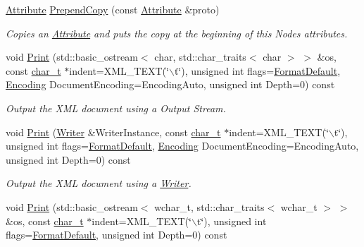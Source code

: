 \begin{DoxyCompactItemize}
\hyperlink{classMezzanine_1_1xml_1_1Attribute}{Attribute} \hyperlink{classMezzanine_1_1xml_1_1Node_a2eba61972c390751d86c2d9beec9b00e}{PrependCopy} (const \hyperlink{classMezzanine_1_1xml_1_1Attribute}{Attribute} \&proto)
\begin{DoxyCompactList}\small\item\em Copies an \hyperlink{classMezzanine_1_1xml_1_1Attribute}{Attribute} and puts the copy at the beginning of this Nodes attributes. \item\end{DoxyCompactList}\item 
void \hyperlink{classMezzanine_1_1xml_1_1Node_a5d07199f212e7736889d370cc40a692b}{Print} (std::basic\_\-ostream$<$ char, std::char\_\-traits$<$ char $>$ $>$ \&os, const \hyperlink{namespaceMezzanine_1_1xml_a29b8a47c179e9895c4e9e66c45d1dbbc}{char\_\-t} $\ast$indent=XML\_\-TEXT(\char`\"{}$\backslash$t\char`\"{}), unsigned int flags=\hyperlink{namespaceMezzanine_1_1xml_ad6b5ebd9ea7799aba19391495e2b09e5}{FormatDefault}, \hyperlink{namespaceMezzanine_1_1xml_ab1e7e96991b9c08ac13e797a15253804}{Encoding} DocumentEncoding=EncodingAuto, unsigned int Depth=0) const 
\begin{DoxyCompactList}\small\item\em Output the XML document using a Output Stream. \item\end{DoxyCompactList}\item 
void \hyperlink{classMezzanine_1_1xml_1_1Node_a94b9b66aff6d1d6a26c1dd5949fabb25}{Print} (\hyperlink{classMezzanine_1_1xml_1_1Writer}{Writer} \&WriterInstance, const \hyperlink{namespaceMezzanine_1_1xml_a29b8a47c179e9895c4e9e66c45d1dbbc}{char\_\-t} $\ast$indent=XML\_\-TEXT(\char`\"{}$\backslash$t\char`\"{}), unsigned int flags=\hyperlink{namespaceMezzanine_1_1xml_ad6b5ebd9ea7799aba19391495e2b09e5}{FormatDefault}, \hyperlink{namespaceMezzanine_1_1xml_ab1e7e96991b9c08ac13e797a15253804}{Encoding} DocumentEncoding=EncodingAuto, unsigned int Depth=0) const 
\begin{DoxyCompactList}\small\item\em Output the XML document using a \hyperlink{classMezzanine_1_1xml_1_1Writer}{Writer}. \item\end{DoxyCompactList}\item 
void \hyperlink{classMezzanine_1_1xml_1_1Node_a6b3af942054ed0e53889bec30663e55d}{Print} (std::basic\_\-ostream$<$ wchar\_\-t, std::char\_\-traits$<$ wchar\_\-t $>$ $>$ \&os, const \hyperlink{namespaceMezzanine_1_1xml_a29b8a47c179e9895c4e9e66c45d1dbbc}{char\_\-t} $\ast$indent=XML\_\-TEXT(\char`\"{}$\backslash$t\char`\"{}), unsigned int flags=\hyperlink{namespaceMezzanine_1_1xml_ad6b5ebd9ea7799aba19391495e2b09e5}{FormatDefault}, unsigned int Depth=0) const 

\end{DoxyCompactItemize}
